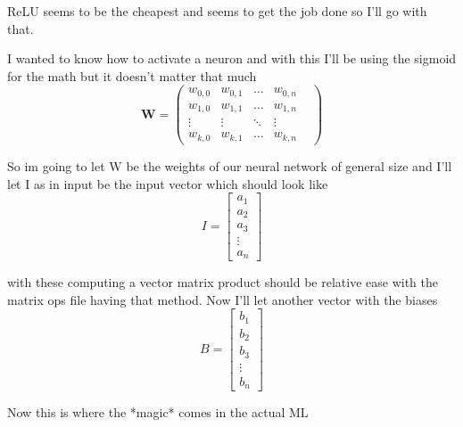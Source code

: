 \documentclass{article}
\begin{document}
\par{ReLU seems to be the cheapest and seems to get the job done so I'll go with that. }
\par{I wanted to know how to activate a neuron and with this I'll be using the sigmoid for the math but it doesn't matter that much}
$$\mathbf{W} = \begin{pmatrix}
    w_{0,0} & w_{0,1} & \dots & w_{0,n} \\
    w_{1,0} & w_{1,1} & \dots & w_{1,n} \\
    \vdots  & \vdots & \ddots & \vdots \\
    w_{k,0} & w_{k,1} & \dots & w_{k,n} &  
\end{pmatrix}$$
\par{So im going to let W be the weights of our neural network of general size and I'll let I as in input be the input vector which should look like}
$$I = \begin{bmatrix}
    a_{1} \\
    a_{2} \\
    a_{3} \\
    \vdots \\
    a_{n}
\end{bmatrix}$$
\par{with these computing a vector matrix product should be relative ease with the matrix ops file having that method.
Now I'll let another vector with the biases}
$$
B = \begin{bmatrix}
    b_{1} \\
    b_{2} \\
    b_{3} \\
    \vdots \\
    b_{n}
\end{bmatrix}
$$
\par{Now this is where the *magic* comes in the actual ML}
\end{document}
